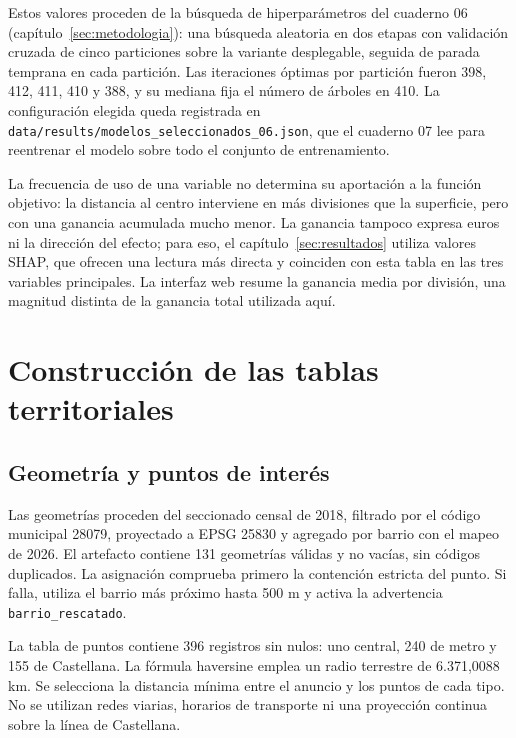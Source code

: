 \documentclass[11pt,a4paper]{article}
\newcounter{anexo}
\newcounter{anexosub}[anexo]
\begin{document}
Estos valores proceden de la búsqueda de hiperparámetros del cuaderno 06 (capítulo~\ref{sec:metodologia}): una búsqueda aleatoria en dos etapas con validación cruzada de cinco particiones sobre la variante desplegable, seguida de parada temprana en cada partición. Las iteraciones óptimas por partición fueron 398, 412, 411, 410 y 388, y su mediana fija el número de árboles en 410. La configuración elegida queda registrada en \texttt{data/results/modelos\_seleccionados\_06.json}, que el cuaderno 07 lee para reentrenar el modelo sobre todo el conjunto de entrenamiento.

La frecuencia de uso de una variable no determina su aportación a la función objetivo: la distancia al centro interviene en más divisiones que la superficie, pero con una ganancia acumulada mucho menor. La ganancia tampoco expresa euros ni la dirección del efecto; para eso, el capítulo~\ref{sec:resultados} utiliza valores SHAP, que ofrecen una lectura más directa y coinciden con esta tabla en las tres variables principales. La interfaz web resume la ganancia media por división, una magnitud distinta de la ganancia total utilizada aquí.

\clearpage{}\label{anx:\theanexo}%
\section*{\theanexo\hspace{0.6em}Construcción de las tablas territoriales}

%
\subsection*{\theanexo\hspace{0.3em}\hspace{0.45em}Geometría y puntos de interés}

Las geometrías proceden del seccionado censal de 2018, filtrado por el código municipal 28079, proyectado a EPSG 25830 y agregado por barrio con el mapeo de 2026. El artefacto contiene 131 geometrías válidas y no vacías, sin códigos duplicados. La asignación comprueba primero la contención estricta del punto. Si falla, utiliza el barrio más próximo hasta 500 m y activa la advertencia \texttt{barrio\_rescatado}.

La tabla de puntos contiene 396 registros sin nulos: uno central, 240 de metro y 155 de Castellana. La fórmula haversine emplea un radio terrestre de 6.371,0088 km. Se selecciona la distancia mínima entre el anuncio y los puntos de cada tipo. No se utilizan redes viarias, horarios de transporte ni una proyección continua sobre la línea de Castellana.
\end{document}
